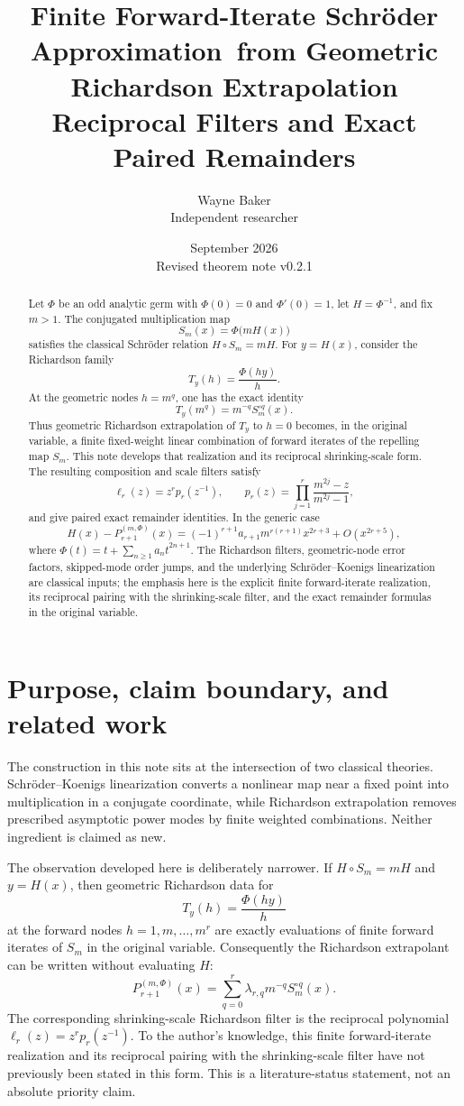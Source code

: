 \documentclass[11pt]{article}
\title{\textbf{Finite Forward-Iterate Schr\"oder Approximation\
from Geometric Richardson Extrapolation}\\
\large Reciprocal Filters and Exact Paired Remainders}
\author{Wayne Baker\\\small Independent researcher}
\date{September 2026\\\small Revised theorem note v0.2.1}
\theoremstyle{remark}
\begin{document}
\maketitle

\begin{abstract}
Let \(\Phi\) be an odd analytic germ with \(\Phi(0)=0\) and
\(\Phi'(0)=1\), let \(H=\Phi^{-1}\), and fix \(m>1\).  The conjugated
multiplication map
\[
S_m(x)=\Phi\!\bigl(mH(x)\bigr)
\]
satisfies the classical Schr\"oder relation \(H\circ S_m=mH\).  For
\(y=H(x)\), consider the Richardson family
\[
T_y(h)=\frac{\Phi(hy)}{h}.
\]
At the geometric nodes \(h=m^q\), one has the exact identity
\[
T_y(m^q)=m^{-q}S_m^{\circ q}(x).
\]
Thus geometric Richardson extrapolation of \(T_y\) to \(h=0\) becomes,
in the original variable, a finite fixed-weight linear combination of
forward iterates of the repelling map \(S_m\).  This note develops that
realization and its reciprocal shrinking-scale form.  The resulting
composition and scale filters satisfy
\[
\ell_r(z)=z^r p_r(z^{-1}),
\qquad
p_r(z)=\prod_{j=1}^r\frac{m^{2j}-z}{m^{2j}-1},
\]
and give paired exact remainder identities.  In the generic case
\[
H(x)-P_{r+1}^{(m,\Phi)}(x)
=
(-1)^{r+1}a_{r+1}m^{r(r+1)}x^{2r+3}+O(x^{2r+5}),
\]
where \(\Phi(t)=t+\sum_{n\ge1}a_nt^{2n+1}\).  The Richardson filters,
geometric-node error factors, skipped-mode order jumps, and the underlying
Schr\"oder--Koenigs linearization are classical inputs; the emphasis here
is the explicit finite forward-iterate realization, its reciprocal pairing
with the shrinking-scale filter, and the exact remainder formulas in the
original variable.
\end{abstract}

\section{Purpose, claim boundary, and related work}

The construction in this note sits at the intersection of two classical
theories.  Schr\"oder--Koenigs linearization converts a nonlinear map near
a fixed point into multiplication in a conjugate coordinate, while
Richardson extrapolation removes prescribed asymptotic power modes by
finite weighted combinations.  Neither ingredient is claimed as new.

The observation developed here is deliberately narrower.  If
\(H\circ S_m=mH\) and \(y=H(x)\), then geometric Richardson data for
\[
T_y(h)=\frac{\Phi(hy)}{h}
\]
at the forward nodes \(h=1,m,\ldots,m^r\) are exactly evaluations of
finite forward iterates of \(S_m\) in the original variable.  Consequently
the Richardson extrapolant can be written without evaluating \(H\):
\[
P_{r+1}^{(m,\Phi)}(x)
=
\sum_{q=0}^r\lambda_{r,q}m^{-q}S_m^{\circ q}(x).
\]
The corresponding shrinking-scale Richardson filter is the reciprocal
polynomial \(\ell_r(z)=z^rp_r(z^{-1})\).  To the author's knowledge, this
finite forward-iterate realization and its reciprocal pairing with the
shrinking-scale filter have not previously been stated in this form.  This
is a literature-status statement, not an absolute priority claim.
\end{document}
